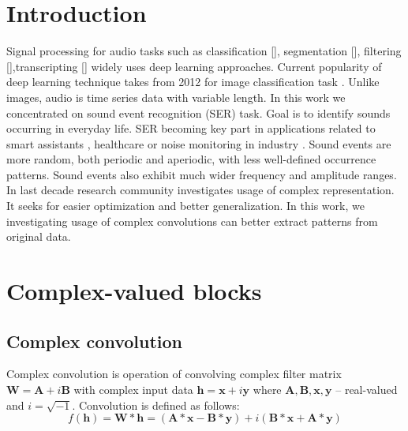 \documentclass{article}
\begin{document}
\section{Introduction}
Signal processing for audio tasks such as classification [\citep{zeng2019spectrogram, xu2018large}], segmentation [\citep{subakan2022using, zeghidour2021wavesplit}], filtering [\citep{defossez2020real, pandey2019tcnn}],transcripting [\citep{leng2021fastcorrect}] widely uses deep learning approaches. 
Current popularity of deep learning technique takes from 2012 for image classification task \citep{NIPS2012_c399862d}. 
Unlike images, audio is time series data with variable length. 
In this work we concentrated on sound event recognition (SER) task. Goal is to identify sounds occurring in everyday life. SER becoming key part in 
applications related to smart assistants \citep{cances2018sound}, healthcare \citep{kim2020occupant,khlaifi2018swallowing} or noise monitoring 
in industry \citet{Trufanov2021a}. 
Sound events are more random, both periodic and aperiodic, with less well-defined occurrence patterns. Sound events also exhibit much wider frequency and amplitude ranges. 
In last decade research community investigates usage of complex representation. It seeks for easier optimization and better generalization. In this work, 
we investigating usage of complex convolutions can better extract patterns from original data. 


\section{Complex-valued blocks}
\label{sec:headings}

\subsection{Complex convolution}
Complex convolution is operation of convolving complex filter matrix $\textbf{W}=\textbf{A}+i\textbf{B}$ 
with complex input data $\textbf{h}=\textbf{x}+i\textbf{y}$
 where $\textbf{A},\textbf{B},\textbf{x},\textbf{y}$ – real-valued and $i=\sqrt{-1}$. Convolution is defined as follows:
\begin{equation}
	f\left(\textbf{h}\right)=\textbf{W}\ast\textbf{h}=\left(\textbf{A}\ast\textbf{x}-\textbf{B}\ast\textbf{y}\right)+i(\textbf{B}\ast\textbf{x}+\textbf{A}\ast\textbf{y})
\end{equation}
\end{document}
